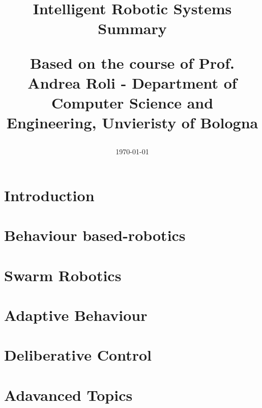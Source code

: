 \documentclass{scrartcl}
\title{Intelligent Robotic Systems
\\
Summary
\\
\begin{small} 
  Based on the course of Prof. Andrea Roli - Department of Computer Science and Engineering, Unvieristy of Bologna
\end{small}
}
\author{
    \emailaddr{davide.domini@studio.unibo.it}
}
\date{\today}
\begin{document}
\maketitle

\newpage

\tableofcontents

\newpage

\section{Introduction}

\newpage

\section{Behaviour based-robotics}

\newpage

\section{Swarm Robotics}


\newpage

\section{Adaptive Behaviour}

\newpage

\section{Deliberative Control}

\newpage

\section{Adavanced Topics}



%
%
\printbibliography %
\end{document}
